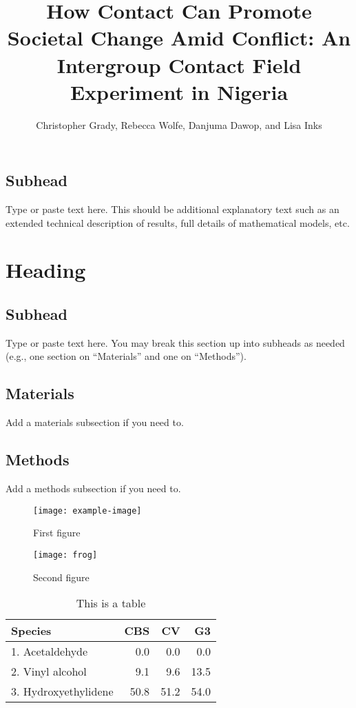 \documentclass[9pt,twoside,lineno]{pnas-new}
\title{How Contact Can Promote Societal Change Amid Conflict: An Intergroup Contact Field Experiment in Nigeria}
\author{Christopher Grady, Rebecca Wolfe, Danjuma Dawop, and Lisa Inks}
\begin{document}
	
	
	\maketitle
	
	\SItext
	
	
	\subsection*{Subhead}
	Type or paste text here. This should be additional explanatory text such as an extended technical description of results, full details of mathematical models, etc.   
	
	\section*{Heading}
	\subsection*{Subhead}
	Type or paste text here. You may break this section up into subheads as needed (e.g., one section on ``Materials'' and one on ``Methods'').
	
	\subsection*{Materials}
	Add a materials subsection if you need to.
	
	\subsection*{Methods}
	Add a methods subsection if you need to.
	
	
	\begin{figure}
		\centering
		\texttt{[image: example-image]}
		\caption{First figure}
	\end{figure}
	
	\begin{figure}
		\centering
		\texttt{[image: frog]}
		\caption{Second figure}
	\end{figure}
	
	\begin{table}\centering
		\caption{This is a table}
		
		\begin{tabular}{lrrr}
			Species & CBS & CV & G3 \\
			\midrule
			1. Acetaldehyde & 0.0 & 0.0 & 0.0 \\
			2. Vinyl alcohol & 9.1 & 9.6 & 13.5 \\
			3. Hydroxyethylidene & 50.8 & 51.2 & 54.0\\
			\bottomrule
		\end{tabular}
	\end{table}
	
\end{document}
